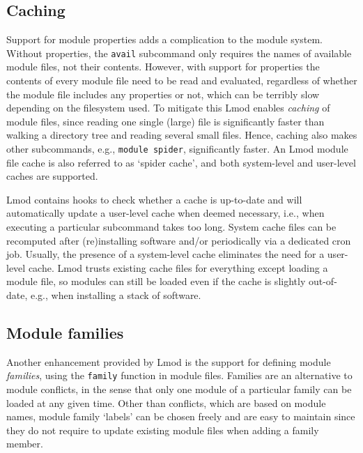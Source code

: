 \subsection{Caching}

Support for module properties adds a complication to the module
system.  Without properties, the \texttt{\small avail} subcommand only requires the
names of available module files, not their contents.  However, with support for
properties the contents of every module file need to be read and evaluated,
regardless of whether the module file includes any properties or not, which can
be terribly slow depending on the filesystem used.  To mitigate this Lmod enables
\emph{caching} of module files, since reading one single (large) file is
significantly faster than walking a directory tree and reading several small files.
Hence, caching also makes other subcommands, e.g., \texttt{\small module spider},
significantly faster. An Lmod module file cache is also referred to as
`spider cache', and both system-level and user-level caches are supported.

Lmod contains hooks to check whether a cache is up-to-date and will automatically
update a user-level cache when deemed necessary, i.e., when executing a particular
subcommand takes too long. System cache files can be recomputed after (re)installing software and/or periodically via a dedicated cron job. Usually, the presence of a
system-level cache eliminates the need for a user-level cache.
Lmod trusts existing cache files for everything except loading a module
file, so modules can still be loaded even if the cache is slightly out-of-date,
e.g., when installing a stack of software.


\subsection{Module families}

Another enhancement provided by Lmod is the support for defining module
\emph{families}, using the \texttt{\small family} function in module files.
Families are an alternative to module conflicts, in the sense that only one module of
a particular family can be loaded at any given time. Other than conflicts, which
are based on module names, module family `labels' can be chosen freely and are easy
to maintain since they do not require to update existing module files when adding a
family member.

